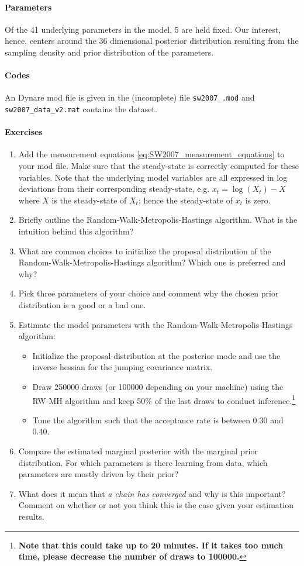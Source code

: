 \documentclass{article}
\begin{document}
\paragraph{Parameters}
Of the 41 underlying parameters in the model, 5 are held fixed.
Our interest, hence, centers around the 36 dimensional posterior distribution resulting from the sampling density and prior distribution of the parameters. 

\paragraph{Codes}
An Dynare mod file is given in the (incomplete) file \texttt{sw2007\_.mod}
and \texttt{sw2007\_data\_v2.mat} contains the dataset.


\newpage
\paragraph{Exercises}
	\begin{enumerate}
	\item Add the measurement equations \eqref{eq:SW2007_measurement_equations} to your mod file.
	Make sure that the steady-state is correctly computed for these variables.
	Note that the underlying model variables are all expressed in log deviations from their corresponding steady-state,
	  e.g. $x_t = \log(X_t) - X$ where $X$ is the steady-state of $X_t$; hence the steady-state of $x_t$ is zero.
	\item Briefly outline the Random-Walk-Metropolis-Hastings algorithm.
	What is the intuition behind this algorithm?
	\item What are common choices to initialize the proposal distribution of the Random-Walk-Metropolis-Hastings algorithm?
	Which one is preferred and why?
	\item Pick three parameters of your choice and comment why the chosen prior distribution is a good or a bad one.
	\item Estimate the model parameters with the Random-Walk-Metropolis-Hastings algorithm:
	\begin{itemize}
		\item Initialize the proposal distribution at the posterior mode and use the inverse hessian for the jumping covariance matrix.
		\item Draw 250000 draws (or 100000 depending on your machine) using the RW-MH algorithm and keep 50\% of the last draws to conduct inference.\footnote{
		\textbf{Note that this could take up to 20 minutes. If it takes too much time, please decrease the number of draws to 100000.}}
		\item Tune the algorithm such that the acceptance rate is between 0.30 and 0.40.		
	\end{itemize}
	\item Compare the estimated marginal posterior with the marginal prior distribution.
	For which parameters is there learning from data, which parameters are mostly driven by their prior?
	\item What does it mean that \emph{a chain has converged} and why is this important?
	Comment on whether or not you think this is the case given your estimation results.	
\end{enumerate}

\newpage

\appendix

\printbibliography
\end{document}
